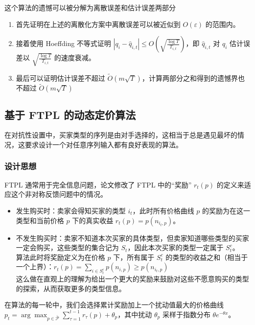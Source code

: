 这个算法的遗憾可以被分解为离散误差和估计误差两部分

\begin{enumerate}
    \item 首先证明在上述的离散化方案中离散误差可以被近似到 $O(\varepsilon)$ 的范围内。
    \item 接着使用 Hoeffding 不等式证明 $|q_i - \hat{q}_{i,t}| \leqslant O(\sqrt{\frac{\log T}{T_{i,t}}})$，即 $\hat{q}_{i,t}$ 对 $q_i$ 估计误差以 $\sqrt{\frac{\log T}{T_{i,t}}}$ 的速度衰减。
    \item 最后可以证明估计误差不超过 $\tilde{O}(m\sqrt{T})$，计算两部分之和得到的遗憾界也不超过 $\tilde{O}(m\sqrt{T})$
\end{enumerate}

\subsection{基于 FTPL 的动态定价算法}

在对抗性设置中，买家类型的序列是由对手选择的，这相当于总是遇见最坏的情况，这要求设计一个对任意序列输入都有良好表现的算法。

\subsubsection{设计思想}

FTPL 通常用于完全信息问题，论文修改了 FTPL 中的“奖励” $r_t(p)$ 的定义来适应这个非对称反馈问题中的情况。

\begin{itemize}
    \item 发生购买时：卖家会得知买家的类型 $i_t$，此时所有价格曲线 $p$ 的奖励为在这一类型和当前价格 $p$ 下的真实收益 $r_t(p) = p(n_{i_t,p})$。
    \item 不发生购买时：卖家不知道本次买家的具体类型，但卖家知道哪些类型的买家一定会购买，这些类型的集合记为 $S_t$，因此本次买家的类型一定属于 $S_t^c$。\\
        算法此时将奖励定义为在价格 $p$ 下，所有属于 $S_t^c$ 的类型的收益之和（相当于一个上界）：$r_t(p) = \sum_{i \in S_t^c} p(n_{i,p}) \geqslant p(n_{i_t,p})$ \\
        这么做在直观上的理解为给出一个更大的奖励来鼓励对这些不愿意购买的类型的探索，从而获取更多的类型信息。
\end{itemize}

在算法的每一轮中，我们会选择累计奖励加上一个扰动值最大的价格曲线 $p_t = \arg\max_{p \in \bar{\mathcal{P}}} \sum_{\tau=1}^{t-1}r_\tau(p) + \theta_p$，其中扰动 $\theta_p$ 采样于指数分布 $\theta e^{-\theta x}$。

